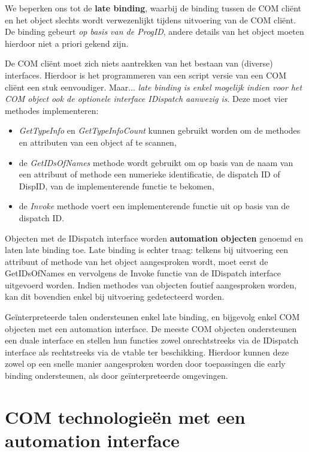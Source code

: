 \documentclass[11pt,a4paper]{report}
\begin{document}
\par We beperken ons tot de \textbf{late binding}, waarbij de binding tussen de COM cliënt en het object slechts wordt verwezenlijkt tijdens uitvoering van de COM cliënt. De binding gebeurt \textit{op basis van de ProgID}, andere details van het object moeten hierdoor niet a priori gekend zijn. 
\par De COM cliënt moet zich niets aantrekken van het bestaan van (diverse) interfaces. Hierdoor is het programmeren van een script versie van een COM cliënt een stuk eenvoudiger.
Maar... \textit{late binding is enkel mogelijk indien voor het COM object ook de optionele interface IDispatch aanwezig is}. Deze moet vier methodes implementeren:
\begin{itemize}
\item \textit{GetTypeInfo} en \textit{GetTypeInfoCount} kunnen gebruikt worden om de methodes en attributen van een object af te scannen,
\item de \textit{GetIDsOfNames} methode wordt gebruikt om op basis van de naam van een attribuut of methode een numerieke identificatie, de dispatch ID of DispID, van de implementerende functie te bekomen, 
\item de \textit{Invoke} methode voert een implementerende functie uit op basis van de dispatch ID.
\end{itemize}
\par Objecten met de IDispatch interface worden \textbf{automation objecten} genoemd en laten late binding toe. Late binding is echter traag: telkens bij uitvoering een attribuut of methode van het object aangesproken wordt, moet eerst de GetIDsOfNames en vervolgens de Invoke functie van de IDispatch interface uitgevoerd worden. Indien methodes van objecten foutief aangesproken worden, kan dit bovendien enkel bij uitvoering gedetecteerd worden.
\par Geïnterpreteerde talen ondersteunen enkel late binding, en bijgevolg enkel COM objecten met een automation interface. De meeste COM objecten ondersteunen een duale interface en stellen hun functies zowel onrechtstreeks via de IDispatch interface als rechtstreeks via de vtable ter beschikking. Hierdoor kunnen deze zowel op een snelle manier aangesproken worden door toepassingen die early binding ondersteunen, als door geïnterpreteerde omgevingen.

\section{COM technologieën met een automation interface}
\end{document}
